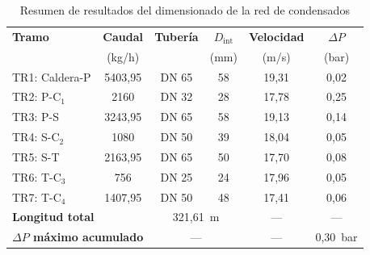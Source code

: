 \begin{table}[H]
	\centering
	\caption{Resumen de resultados del dimensionado de la red de condensados}
	\label{tab:conclusiones-red-condensados}
	\begin{tabular}{lccccc}
		\toprule
		\textbf{Tramo}                                           & \textbf{Caudal}              & \textbf{Tubería} & \textbf{$D_{\text{int}}$} & \textbf{Velocidad} & \textbf{$\Delta P$} \\
		                                                         & (kg/h)                       &                  & (mm)                      & (m/s)              & (bar)               \\
		\midrule
		TR1: Caldera-P                                           & 5403,95                      & DN 65            & 58                        & 19,31              & 0,02                \\
		TR2: P-C$_1$                                             & 2160                         & DN 32            & 28                        & 17,78              & 0,25                \\
		TR3: P-S                                                 & 3243,95                      & DN 65            & 58                        & 19,13              & 0,14                \\
		TR4: S-C$_2$                                             & 1080                         & DN 50            & 39                        & 18,04              & 0,05                \\
		TR5: S-T                                                 & 2163,95                      & DN 65            & 50                        & 17,70              & 0,08                \\
		TR6: T-C$_3$                                             & 756                          & DN 25            & 24                        & 17,96              & 0,05                \\
		TR7: T-C$_4$                                             & 1407,95                      & DN 50            & 48                        & 17,41              & 0,06                \\
		\midrule
		\multicolumn{2}{l}{\textbf{Longitud total}}              & \multicolumn{2}{c}{321,61~m} & ---              & ---                                                                  \\
		\multicolumn{2}{l}{\textbf{$\Delta P$ máximo acumulado}} & \multicolumn{2}{c}{---}      & ---              & 0,30~bar                                                             \\
		\bottomrule
	\end{tabular}
\end{table}

